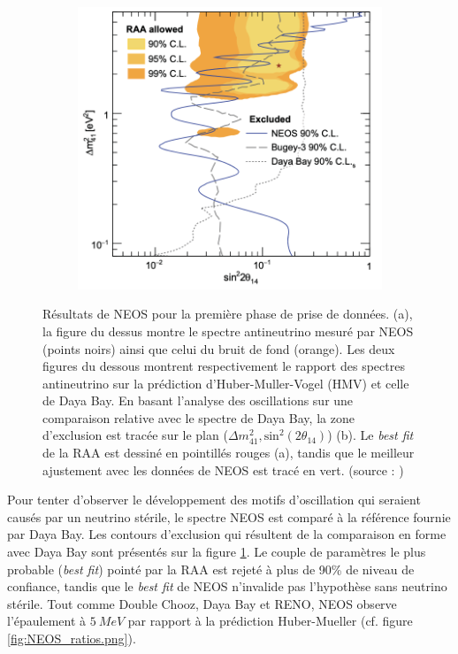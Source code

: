 {\begin{figure}[h!]
\begin{subfigure}[b]{0.49\textwidth}
\includegraphics[width=1\textwidth]{images/NEOS_exclusion.png}
\caption{}
\label{fig:NEOS_exclusion.png}
\end{subfigure}
\caption[Résultats de NEOS pour la première phase de prise de données]{Résultats de NEOS pour la première phase de prise de données. (a), la figure du dessus montre le spectre antineutrino mesuré par NEOS (points noirs) ainsi que celui du bruit de fond (orange). Les deux figures du dessous montrent respectivement le rapport des spectres antineutrino sur la prédiction d'Huber-Muller-Vogel (HMV) et celle de Daya Bay. En basant l'analyse des oscillations sur une comparaison relative avec le spectre de Daya Bay, la zone d'exclusion est tracée sur le plan ($\Delta m^2_{41}, \textrm{sin}^2(2\theta_{14})$) (b). Le \textit{best fit} de la RAA est dessiné en pointillés rouges (a), tandis que le meilleur ajustement avec les données de NEOS est tracé en vert. (source : \cite{Ko:2016owz})}
\label{fig:NEOS_results}
\end{figure}

}

Pour tenter d'observer le développement des motifs d'oscillation qui seraient causés par un neutrino stérile, le spectre NEOS est comparé à la référence fournie par Daya Bay. Les contours d'exclusion qui résultent de la comparaison en forme avec Daya Bay sont présentés sur la figure \ref{fig:NEOS_exclusion.png}. Le couple de paramètres le plus probable (\textit{best fit}) pointé par la RAA est rejeté à plus de 90\% de niveau de confiance, tandis que le \textit{best fit} de NEOS n'invalide pas l'hypothèse sans neutrino stérile. Tout comme Double Chooz, Daya Bay et RENO, NEOS observe l'épaulement à $\SI{5}{MeV}$ par rapport à la prédiction Huber-Mueller (cf. figure \ref{fig:NEOS_ratios.png}).\\

